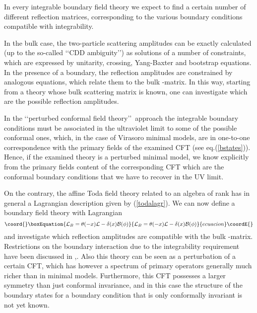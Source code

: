 \documentclass[a4paper,12pt]{report}
\begin{document}
In every integrable boundary field theory we expect to find a certain number of different reflection matrices,
corresponding to the various boundary conditions compatible with integrability.

In the bulk case, the two-particle scattering amplitudes can be exactly calculated (up to the so-called \lq\lq CDD
ambiguity\rq\rq) as solutions of a number of constraints, which are expressed by unitarity, crossing, Yang-Baxter
and bootstrap equations. In the presence of a boundary, the reflection amplitudes are constrained by analogous
equations, which relate them to the bulk \coordHE{}-matrix. In this way, starting from a theory whose bulk scattering
matrix is known, one can investigate which are the possible reflection amplitudes.

\vspace{0.5cm}

In the \lq\lq perturbed conformal field theory\rq\rq \, approach the integrable boundary conditions must be
associated in the ultraviolet limit to some of the possible conformal ones, which, in the case of Virasoro
minimal models, are in one-to-one correspondence with the primary fields of the examined CFT (see
eq.(\ref{bstates})). Hence, if the examined theory is a perturbed minimal model, we know explicitly from the
primary fields content of the corresponding CFT which are the conformal boundary conditions that we have to
recover in the UV limit.

On the contrary, the affine Toda field theory related to an algebra \coordHE{} of rank \coordHE{} has in general a Lagrangian
description given by (\ref{todalagr}). We can now define a boundary field theory with Lagrangian
\begin{equation}\coord{}\boxEquation{\label{todabound}
{\cal L}_{B}=\theta(-x){\cal L}-\delta(x){\cal B}(\phi)
}{{\cal L}_{B}=\theta(-x){\cal L}-\delta(x){\cal B}(\phi)
}{ecuacion}\coordE{}\end{equation}
and investigate which reflection amplitudes are compatible with the bulk \coordHE{}-matrix. Restrictions on the boundary
interaction \coordHE{} due to the integrability requirement have been discussed in \cite{durb},\cite{durb2}.
Also this theory can be seen as a perturbation of a certain CFT, which has however a spectrum of primary operators
generally much richer than in minimal models. Furthermore, this CFT possesses a larger symmetry than just
conformal invariance, and in this case the structure of the boundary states for a boundary condition that is only
conformally invariant is not yet known.
\end{document}
